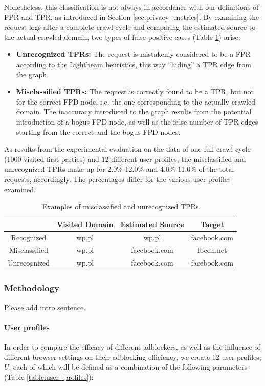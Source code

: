 \documentclass{sig-alternate}
\begin{document}
Nonetheless, this classification is not always in accordance with our definitions of FPR and TPR, as introduced in Section \ref{sec:privacy_metrics}. By examining the request logs after a complete crawl cycle and comparing the estimated source to the actual crawled domain, two types of false-positive cases (Table \ref{table:false_positive_examples}) arise:

\begin{itemize}
\item \textbf{Unrecognized TPRs:} The request is mistakenly considered to be a FPR according to the Lightbeam heuristics, this way ``hiding'' a TPR edge from the graph.
\item \textbf{Misclassified TPRs:} The request is correctly found to be a TPR, but not for the correct FPD node, i.e. the one corresponding to the actually crawled domain. The inaccuracy introduced to the graph results from the potential introduction of a bogus FPD node, as well as the false number of TPR edges starting from the correct and the bogus FPD nodes.
\end{itemize}

As results from the experimental evaluation on the data of one full crawl cycle (1000 visited first parties) and 12 different user profiles, the misclassified and unrecognized TPRs make up for 2.0\%-12.0\% and 4.0\%-11.0\% of the total requests, accordingly. The percentages differ for the various user profiles examined.

\begin{table}
\centering
\small
\begin{tabular}{|c|c c c|}
\hline
& Visited Domain & Estimated Source & Target \\
\hline
Recognized & wp.pl & wp.pl & facebook.com \\
Misclassified & wp.pl & facebook.com & fbcdn.net \\
Unrecognized & wp.pl & facebook.com & facebook.com \\
\hline
\end{tabular}
\caption{Examples of misclassified and unrecognized TPRs}
\label{table:false_positive_examples}
\end{table}

\subsubsection{Methodology}
{\color{red}Please add intro sentence.}
\paragraph{User profiles}
\label{sec:user_profiles}
In order to compare the efficacy of different adblockers, as well as the influence of different browser settings on their adblocking efficiency, we create 12 user profiles, $U$, each of which will be defined as a combination of the following parameters (Table \ref{table:user_profiles}):
\end{document}
